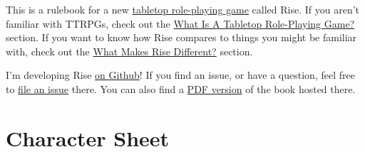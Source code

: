 \documentclass[oneside]{book} %
\begin{document}
This is a rulebook for a new \href{https://en.wikipedia.org/wiki/Tabletop_role-playing_game}{tabletop role-playing game} called Rise.
If you aren't familiar with TTRPGs, check out the \href{/rise/risese1.html}{What Is A Tabletop Role-Playing Game?} section.
If you want to know how Rise compares to things you might be familiar with, check out the \href{/rise/risese2.html}{What Makes Rise Different?} section.

I'm developing Rise \href{https://github.com/Vadskye/Rise}{on Github}! If you find an issue, or have a question, feel free to \href{https://github.com/Vadskye/Rise/issues/new/choose}{file an issue} there. You can also find a \href{https://github.com/Vadskye/Rise/raw/master/core_book/Rise.pdf}{PDF version} of the book hosted there.

\tableofcontents


















\appendix



























\chapter{Character Sheet}
\end{document}
